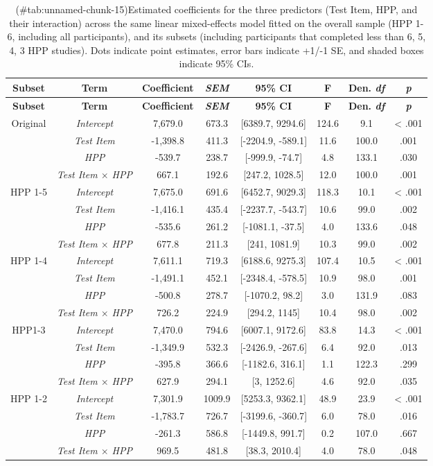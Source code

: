 \begin{appendix}
\begin{longtable}[]{@{}cccccccc@{}}
\caption{(\#tab:unnamed-chunk-15)Estimated coefficients for the three
predictors (Test Item, HPP, and their interaction) across the same
linear mixed-effects model fitted on the overall sample (HPP 1-6,
including all participants), and its subsets (including participants
that completed less than 6, 5, 4, 3 HPP studies). Dots indicate point
estimates, error bars indicate +1/-1 SE, and shaded boxes indicate 95\%
CIs.}\tabularnewline
\toprule
\textbf{Subset} & \textbf{Term} & \textbf{Coefficient} &
\textbf{\emph{SEM}} & \textbf{95\% CI} & \textbf{F} & \textbf{Den.
\emph{df}} & \textbf{\emph{p}}\tabularnewline
\midrule
\endfirsthead
\toprule
\textbf{Subset} & \textbf{Term} & \textbf{Coefficient} &
\textbf{\emph{SEM}} & \textbf{95\% CI} & \textbf{F} & \textbf{Den.
\emph{df}} & \textbf{\emph{p}}\tabularnewline
\midrule
\endhead
Original & \emph{Intercept} & 7,679.0 & 673.3 & {[}6389.7, 9294.6{]} &
124.6 & 9.1 & \textless{} .001\tabularnewline
& \emph{Test Item} & -1,398.8 & 411.3 & {[}-2204.9, -589.1{]} & 11.6 &
100.0 & .001\tabularnewline
& \emph{HPP} & -539.7 & 238.7 & {[}-999.9, -74.7{]} & 4.8 & 133.1 &
.030\tabularnewline
& \emph{Test Item \(\times\) HPP} & 667.1 & 192.6 & {[}247.2, 1028.5{]}
& 12.0 & 100.0 & .001\tabularnewline
HPP 1-5 & \emph{Intercept} & 7,675.0 & 691.6 & {[}6452.7, 9029.3{]} &
118.3 & 10.1 & \textless{} .001\tabularnewline
& \emph{Test Item} & -1,416.1 & 435.4 & {[}-2237.7, -543.7{]} & 10.6 &
99.0 & .002\tabularnewline
& \emph{HPP} & -535.6 & 261.2 & {[}-1081.1, -37.5{]} & 4.0 & 133.6 &
.048\tabularnewline
& \emph{Test Item \(\times\) HPP} & 677.8 & 211.3 & {[}241, 1081.9{]} &
10.3 & 99.0 & .002\tabularnewline
HPP 1-4 & \emph{Intercept} & 7,611.1 & 719.3 & {[}6188.6, 9275.3{]} &
107.4 & 10.5 & \textless{} .001\tabularnewline
& \emph{Test Item} & -1,491.1 & 452.1 & {[}-2348.4, -578.5{]} & 10.9 &
98.0 & .001\tabularnewline
& \emph{HPP} & -500.8 & 278.7 & {[}-1070.2, 98.2{]} & 3.0 & 131.9 &
.083\tabularnewline
& \emph{Test Item \(\times\) HPP} & 726.2 & 224.9 & {[}294.2, 1145{]} &
10.4 & 98.0 & .002\tabularnewline
HPP1-3 & \emph{Intercept} & 7,470.0 & 794.6 & {[}6007.1, 9172.6{]} &
83.8 & 14.3 & \textless{} .001\tabularnewline
& \emph{Test Item} & -1,349.9 & 532.3 & {[}-2426.9, -267.6{]} & 6.4 &
92.0 & .013\tabularnewline
& \emph{HPP} & -395.8 & 366.6 & {[}-1182.6, 316.1{]} & 1.1 & 122.3 &
.299\tabularnewline
& \emph{Test Item \(\times\) HPP} & 627.9 & 294.1 & {[}3, 1252.6{]} &
4.6 & 92.0 & .035\tabularnewline
HPP 1-2 & \emph{Intercept} & 7,301.9 & 1009.9 & {[}5253.3, 9362.1{]} &
48.9 & 23.9 & \textless{} .001\tabularnewline
& \emph{Test Item} & -1,783.7 & 726.7 & {[}-3199.6, -360.7{]} & 6.0 &
78.0 & .016\tabularnewline
& \emph{HPP} & -261.3 & 586.8 & {[}-1449.8, 991.7{]} & 0.2 & 107.0 &
.667\tabularnewline
& \emph{Test Item \(\times\) HPP} & 969.5 & 481.8 & {[}38.3, 2010.4{]} &
4.0 & 78.0 & .048\tabularnewline
\bottomrule
\end{longtable}


\end{appendix}
